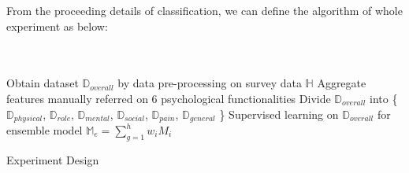\documentclass[12pt]{article}
\begin{document}
From the proceeding details of classification, we can define the algorithm of whole experiment as below: \\\\\\
\IncMargin{2em}
\begin{algorithm}[H]
\BlankLine
Obtain dataset $\mathbb{D}_{overall}$ by data pre-processing on survey data $\mathbb{H}$\;
Aggregate features manually referred on 6 psychological functionalities \;
Divide $\mathbb{D}_{overall}$ into \{$\mathbb{D}_{physical}$, $\mathbb{D}_{role}$, $\mathbb{D}_{mental}$, $\mathbb{D}_{social}$, $\mathbb{D}_{pain}$, $\mathbb{D}_{general}$ \}\;
Supervised learning on $\mathbb{D}_{overall}$ for ensemble model $\mathbb{M}_{e} = \sum_{g = 1}^{h} w_{i} M_{i} $\;
\caption{Experiment Design}\label{experiment}
\end{algorithm}\DecMargin{2em}
\end{document}
